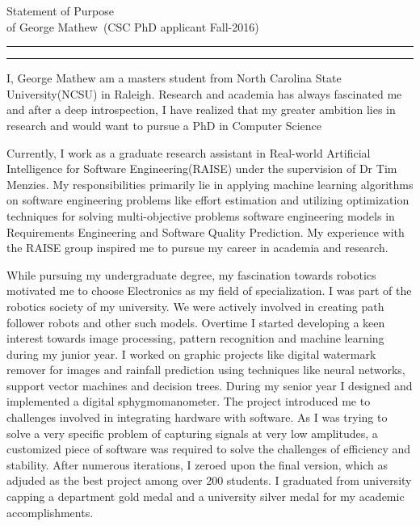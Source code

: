 \documentclass{article}
\newcommand{\soptitle}{Statement of Purpose}
\newcommand{\yourname}{George Mathew}
\begin{document}
\begin{center}\LARGE\soptitle\\
\large of \yourname\ (CSC PhD applicant Fall-2016)
\end{center}

\hrule
\vspace{1pt}
\hrule height 1pt

\bigskip

I, George Mathew am a masters student from North Carolina State University(NCSU) in Raleigh. Research and academia has always fascinated me and after a deep introspection, I have realized that my greater ambition lies in research and would want to pursue a PhD in Computer Science

\bigskip
Currently, I work as a graduate research assistant in Real-world Artificial Intelligence for 
Software Engineering(RAISE) under the supervision of Dr Tim Menzies.
 My responsibilities primarily lie in applying machine learning algorithms on software engineering 
 problems like effort estimation and utilizing optimization techniques for solving multi-objective problems software engineering models in Requirements Engineering and Software Quality Prediction. My experience with the RAISE group inspired me to pursue my career in academia and research. 

\bigskip

While pursuing my undergraduate degree, my fascination towards robotics motivated me to choose Electronics as my field of specialization. I was part of the robotics society of my university. We were actively involved in creating path follower robots and other such models. Overtime I started developing a keen interest towards image 
processing, pattern recognition and machine learning during my junior year. I worked on 
graphic projects like digital watermark remover for images and rainfall prediction using techniques like neural 
networks, support vector machines and decision trees. During my senior year I designed and implemented a digital sphygmomanometer. The project introduced me to challenges involved in integrating hardware with software. As I was trying to solve a very specific problem of capturing signals at very low amplitudes, a customized piece of software was required to solve the challenges of efficiency and stability. After numerous iterations, I zeroed upon the final version, which as adjuded as the best project among over 200 students. I graduated from university capping a department gold 
medal and a university silver medal for my academic accomplishments.
\end{document}
